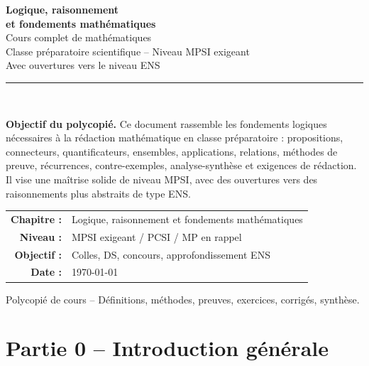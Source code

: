 \documentclass[11pt,a4paper]{article}
\begin{document}
\begin{titlepage}
\centering
\vspace*{1.2cm}

{\Huge\bfseries Logique, raisonnement}\\[0.25cm]
{\Huge\bfseries et fondements mathématiques}\\[0.6cm]

{\Large Cours complet de mathématiques}\\[0.2cm]
{\Large Classe préparatoire scientifique -- Niveau MPSI exigeant}\\[0.2cm]
{\large Avec ouvertures vers le niveau ENS}\\[1cm]

\rule{0.88\textwidth}{0.6pt}\\[0.8cm]

\begin{tcolorbox}[colback=bleuclair,colframe=bleuprepa,width=0.9\textwidth]
\textbf{Objectif du polycopié.}
Ce document rassemble les fondements logiques nécessaires à la rédaction mathématique en classe préparatoire : propositions, connecteurs, quantificateurs, ensembles, applications, relations, méthodes de preuve, récurrences, contre-exemples, analyse-synthèse et exigences de rédaction. Il vise une maîtrise solide de niveau MPSI, avec des ouvertures vers des raisonnements plus abstraits de type ENS.
\end{tcolorbox}

\vspace{0.8cm}

\begin{tabular}{rl}
\textbf{Chapitre :} & Logique, raisonnement et fondements mathématiques\\
\textbf{Niveau :} & MPSI exigeant / PCSI / MP en rappel\\
\textbf{Objectif :} & Colles, DS, concours, approfondissement ENS\\
\textbf{Date :} & \today
\end{tabular}

\vfill

{\large Polycopié de cours -- Définitions, méthodes, preuves, exercices, corrigés, synthèse.}

\end{titlepage}

\tableofcontents
\newpage

\section*{Partie 0 -- Introduction générale}
\end{document}
